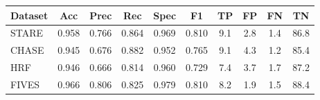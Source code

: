 \begin{tabular}{l ccccc cccc}
\toprule
Dataset & Acc & Prec & Rec & Spec & F1 & TP & FP & FN & TN \\
\midrule
STARE & 0.958 & 0.766 & 0.864 & 0.969 & 0.810 & 9.1 & 2.8 & 1.4 & 86.8 \\
CHASE & 0.945 & 0.676 & 0.882 & 0.952 & 0.765 & 9.1 & 4.3 & 1.2 & 85.4 \\
HRF & 0.946 & 0.666 & 0.814 & 0.960 & 0.729 & 7.4 & 3.7 & 1.7 & 87.2 \\
\midrule
FIVES & 0.966 & 0.806 & 0.825 & 0.979 & 0.810 & 8.2 & 1.9 & 1.5 & 88.4 \\
\bottomrule
\end{tabular}